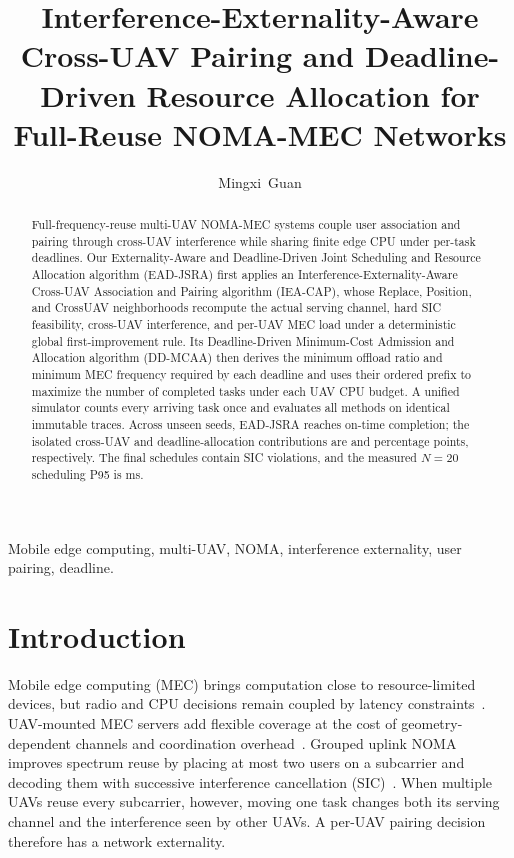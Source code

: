 \documentclass[journal]{IEEEtran}
\begin{document}
\title{Interference-Externality-Aware Cross-UAV Pairing and Deadline-Driven Resource Allocation for Full-Reuse NOMA-MEC Networks}
\author{Mingxi~Guan}
\maketitle

\begin{abstract}
Full-frequency-reuse multi-UAV NOMA-MEC systems couple user association and pairing through
cross-UAV interference while sharing finite edge CPU under per-task deadlines. Our Externality-Aware
and Deadline-Driven Joint Scheduling and Resource Allocation algorithm (EAD-JSRA) first applies an
Interference-Externality-Aware Cross-UAV Association and Pairing algorithm (IEA-CAP), whose Replace, Position, and CrossUAV neighborhoods
recompute the actual serving channel, hard SIC feasibility, cross-UAV interference, and per-UAV
MEC load under a deterministic global first-improvement rule. Its Deadline-Driven Minimum-Cost
Admission and Allocation algorithm (DD-MCAA) then derives the minimum offload
ratio and minimum MEC frequency required by each deadline and uses their ordered prefix to maximize
the number of completed tasks under each UAV CPU budget. A unified simulator counts every arriving
task once and evaluates all methods on identical immutable traces. Across \ConfirmatorySeedCount{}
unseen seeds, EAD-JSRA reaches \FullOnTimePercent{} on-time completion; the isolated
cross-UAV and deadline-allocation contributions are \InnovationOneCrossGainPP{} and
\InnovationTwoGainPP{} percentage points, respectively. The final schedules contain
\SICViolationCount{} SIC violations, and the measured $N=20$ scheduling P95 is
\FullRuntimePNinetyFiveMs{} ms.
\end{abstract}

\begin{IEEEkeywords}
Mobile edge computing, multi-UAV, NOMA, interference externality, user pairing, deadline.
\end{IEEEkeywords}

\section{Introduction}
Mobile edge computing (MEC) brings computation close to resource-limited devices, but radio and
CPU decisions remain coupled by latency constraints~\cite{mao2017survey}. UAV-mounted MEC servers
add flexible coverage at the cost of geometry-dependent channels and coordination
overhead~\cite{zeng2016uav,alhourani2014optimal}. Grouped uplink NOMA improves spectrum reuse by
placing at most two users on a subcarrier and decoding them with successive interference
cancellation (SIC)~\cite{ding2017survey,ali2016dynamic}. When multiple UAVs reuse every
subcarrier, however, moving one task changes both its serving channel and the interference seen
by other UAVs. A per-UAV pairing decision therefore has a network externality.
\end{document}

